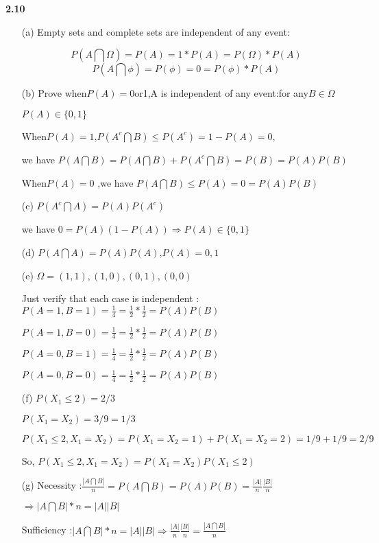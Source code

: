\noindent\textbf{2.10}

\begin{enumerate}
    \item[(a)]Empty sets and complete sets are independent of any event:

$$P(A\bigcap\Omega)=P(A)=1*P(A)=P(\Omega)*P(A)$$
$$P(A\bigcap\phi)=P(\phi)=0=P(\phi)*P(A)$$

\item[(b)]Prove when$P(A)=0$or1,A is independent of any event:for any$B\in\Omega$

$P(A)\in\{0,1\}$

When$P(A)=1$,$P(A^c \bigcap B)\leq P(A^c) = 1-P(A) =0$,

we have $P(A \bigcap B) = P(A \bigcap B) + P(A^c \bigcap B) = P(B) = P(A)P(B)$

When$P(A)=0$ ,we have $P(A \bigcap B)\leq P(A) =0=P(A)P(B)$

\item[(c)]$P(A^c \bigcap A) = P(A)P(A^c)$

we have $0=P(A)(1-P(A))\Rightarrow P(A)\in\{0,1\}$

\item[(d)]$P(A \bigcap A) = P(A)P(A)$,$P(A)=0,1$

\item[(e)]$\Omega=(1,1),(1,0),(0,1),(0,0)$

Just verify that each case is independent :$P(A=1,B=1)=\frac{1}{4}=\frac{1}{2} *\frac{1}{2}=P(A)P(B)$

$P(A=1,B=0)=\frac{1}{4}=\frac{1}{2} *\frac{1}{2}=P(A)P(B)$

$P(A=0,B=1)=\frac{1}{4}=\frac{1}{2} *\frac{1}{2}=P(A)P(B)$

$P(A=0,B=0)=\frac{1}{4}=\frac{1}{2} *\frac{1}{2}=P(A)P(B)$

\item[(f)]$P(X_1 \leq 2)=2/3$

$P(X_1 = X_2)=3/9=1/3$

$P(X_1 \leq 2,X_1 = X_2)=P(X_1 = X_2=1)+P(X_1 = X_2=2)=1/9+1/9=2/9$

So, $P(X_1 \leq 2,X_1 = X_2)=P(X_1 = X_2)P(X_1 \leq 2)$

\item[(g)]Necessity :$\frac{|A\bigcap B|}{n}=P(A \bigcap B)=P(A)P(B)=\frac{|A|}{n}\frac{|B|}{n}$

$\Rightarrow |A\bigcap B|*n = |A||B|$

Sufficiency :$|A\bigcap B|*n = |A||B|\Rightarrow \frac{|A|}{n}\frac{|B|}{n}=\frac{|A\bigcap B|}{n}$


\end{enumerate}
